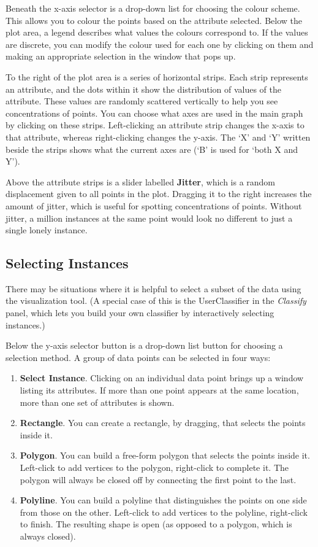 \documentclass[a4paper]{article}
\begin{document}
Beneath the x-axis selector is a drop-down list for choosing the
colour scheme.  This allows you to colour the points based on the
attribute selected.  Below the plot area, a legend describes what
values the colours correspond to. If the values are discrete, you can
modify the colour used for each one by clicking on them and making an
appropriate selection in the window that pops up.

To the right of the plot area is a series of horizontal strips. Each
strip represents an attribute, and the dots within it show the
distribution of values of the attribute.  These values are randomly
scattered vertically to help you see concentrations of points.  You
can choose what axes are used in the main graph by clicking on these
strips.  Left-clicking an attribute strip changes the x-axis to that
attribute, whereas right-clicking changes the y-axis. The `X' and `Y'
written beside the strips shows what the current axes are (`B' is used
for `both X and Y').

Above the attribute strips is a slider labelled \textbf{Jitter}, which
is a random displacement given to all points in the plot.  Dragging it
to the right increases the amount of jitter, which is useful for
spotting concentrations of points. Without jitter, a million instances
at the same point would look no different to just a single lonely
instance.

\subsection{Selecting Instances}

There may be situations where it is helpful to select a subset of the
data using the visualization tool. (A special case of this is the
UserClassifier in the {\em Classify} panel, which lets you build your
own classifier by interactively selecting instances.)

Below the y-axis selector button is a drop-down list button for choosing a
selection method.  A group of data points can be selected in four ways:

\begin{enumerate}
\item \textbf{Select Instance}.
Clicking on an individual data point brings up a window listing its attributes.
If more than one point appears at the same location, more than one set of
attributes is shown.
\item \textbf{Rectangle}.
You can create a rectangle, by dragging, that selects the points inside it.
\item \textbf{Polygon}.
You can build a free-form polygon that selects the points inside it. Left-click
to add vertices to the polygon, right-click to complete it. The polygon will
always be closed off by connecting the first point to the last.
\item \textbf{Polyline}.
You can build a polyline that distinguishes the points on one side from those
on the other. Left-click to add vertices to the polyline, right-click to
finish. The resulting shape is open (as opposed to a polygon, which is
always closed).
\end{enumerate}
\end{document}
